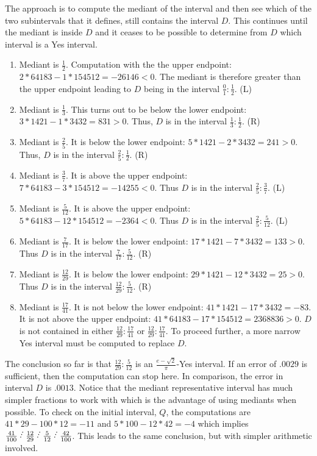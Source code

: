 \documentclass[12pt]{article}
\begin{document}
The approach is to compute the mediant of the interval and then see which of the two subintervals that it defines, still contains the interval $D$. This continues until the mediant is inside $D$ and it ceases to be possible to determine from $D$ which interval is a Yes interval. 
\begin{enumerate}
\item Mediant is $\frac{1}{2}$. Computation with the the upper endpoint:  $2*64183 - 1*154512 = -26146 < 0$. The mediant is therefore greater than the upper endpoint leading to $D$ being in the interval $\frac{0}{1}: \frac{1}{2}$. (L)
\item Mediant is $\frac{1}{3}$. This turns out to be below the lower endpoint:  $3*1421 - 1*3432 = 831>0$. Thus, $D$ is in the interval $\frac{1}{3}: \frac{1}{2}$. (R)
\item Mediant is $\frac{2}{5}$. It is below the lower endpoint: $5*1421 - 2*3432 = 241 > 0$. Thus, $D$ is in the interval $\frac{2}{5}: \frac{1}{2}$. (R)
\item Mediant is $\frac{3}{7}$. It is above the upper endpoint: $7*64183- 3*154512 = -14255 < 0$. Thus $D$ is in the interval $\frac{2}{5}: \frac{3}{7}$. (L)
\item Mediant is $\frac{5}{12}$. It is above the upper endpoint: $5*64183 - 12*154512 = -2364 < 0$. Thus $D$ is in the interval $\frac{2}{5}: \frac{5}{12}$. (L)
\item Mediant is $\frac{7}{17}$. It is below the lower endpoint: $17*1421 - 7*3432 = 133 > 0$. Thus $D$ is in the interval $\frac{7}{17}: \frac{5}{12}$. (R)
\item Mediant is $\frac{12}{29}$. It is below the lower endpoint: $29*1421 - 12*3432 = 25 > 0$. Thus $D$ is in the interval $\frac{12}{29}: \frac{5}{12}$. (R)
\item Mediant is $\frac{17}{41}$. It is not below the lower endpoint: $41*1421-17*3432 = -83$. It is not above the upper endpoint: $41*64183-17*154512 = 2368836 >0$. $D$ is not contained in either $\frac{12}{29}: \frac{17}{41}$ or $\frac{12}{29}:\frac{17}{41}$. To proceed further, a more narrow Yes interval must be computed to replace $D$. 
\end{enumerate}
The conclusion so far is that $\frac{12}{29}: \frac{5}{12}$ is an $\frac{e-\sqrt{2}}{\pi}$-Yes interval. If an error of $.0029$ is sufficient, then the computation can stop here. In comparison, the error in interval $D$ is $.0013$. Notice that the mediant representative interval has much simpler fractions to work with which is the advantage of using mediants when possible. To check on the initial interval, $Q$, the computations are $41*29 - 100*12 = -11$ and $5*100-12*42 = -4$ which implies $\frac{41}{100}\lte \frac{12}{29} \lte  \frac{5}{12}\lte \frac{42}{100}$. This leads to the same conclusion, but with simpler arithmetic involved. 
\end{document}
